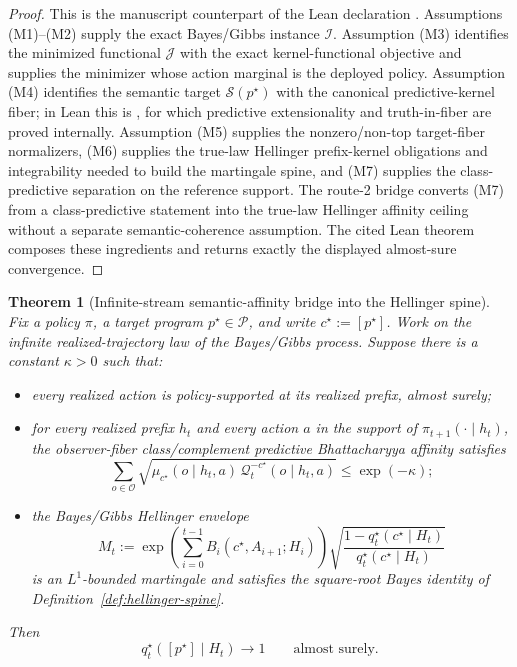 \documentclass[11pt]{article}
\newtheorem{theorem}{Theorem}[section]
\theoremstyle{definition}
\theoremstyle{remark}
\newcommand{\Ocal}{\mathcal{O}}
\newcommand{\Pcal}{\mathcal{P}}
\newcommand{\Qcal}{\mathcal{Q}}
\newcommand{\Scal}{\mathcal{S}}
\begin{document}
\begin{proof}
This is the manuscript counterpart of the Lean declaration .
Assumptions \textup{(M1)--(M2)} supply the exact Bayes/Gibbs instance $\mathcal I$. Assumption \textup{(M3)} identifies the minimized functional $\mathcal J$ with the exact kernel-functional objective and supplies the minimizer whose action marginal is the deployed policy. Assumption \textup{(M4)} identifies the semantic target $\Scal(p^\star)$ with the canonical predictive-kernel fiber; in Lean this is , for which predictive extensionality and truth-in-fiber are proved internally. Assumption \textup{(M5)} supplies the nonzero/non-top target-fiber normalizers, \textup{(M6)} supplies the true-law Hellinger prefix-kernel obligations and integrability needed to build the martingale spine, and \textup{(M7)} supplies the class-predictive separation on the reference support. The route-2 bridge converts \textup{(M7)} from a class-predictive statement into the true-law Hellinger affinity ceiling without a separate semantic-coherence assumption. The cited Lean theorem composes these ingredients and returns exactly the displayed almost-sure convergence.
\end{proof}

\begin{theorem}[Infinite-stream semantic-affinity bridge into the Hellinger spine]
\label{thm:infinite-affinity-hellinger-bridge}
Fix a policy $\pi$, a target program $p^\star\in\Pcal$, and write $c^\star:=[p^\star]$. Work on the infinite realized-trajectory law of the Bayes/Gibbs process. Suppose there is a constant $\kappa>0$ such that:
\begin{itemize}
\item[(i)] every realized action is policy-supported at its realized prefix, almost surely;
\item[(ii)] for every realized prefix $h_t$ and every action $a$ in the support of $\pi_{t+1}(\cdot\mid h_t)$, the observer-fiber class/complement predictive Bhattacharyya affinity satisfies
\[
\sum_{o\in\Ocal}
\sqrt{
\mu_{c^\star}(o\mid h_t,a)\,
\Qcal_t^{-c^\star}(o\mid h_t,a)
}
\le \exp(-\kappa);
\]
\item[(iii)] the Bayes/Gibbs Hellinger envelope
\[
M_t
:=
\exp\!\left(\sum_{i=0}^{t-1}B_i(c^\star,A_{i+1};H_i)\right)
\sqrt{
\frac{1-q_t^\star(c^\star\mid H_t)}
     {q_t^\star(c^\star\mid H_t)}
}
\]
is an $L^1$-bounded martingale and satisfies the square-root Bayes identity of Definition~\ref{def:hellinger-spine}.
\end{itemize}
Then
\[
q_t^\star([p^\star]\mid H_t)\longrightarrow 1
\qquad
\text{almost surely.}
\]
\end{theorem}
\end{document}
